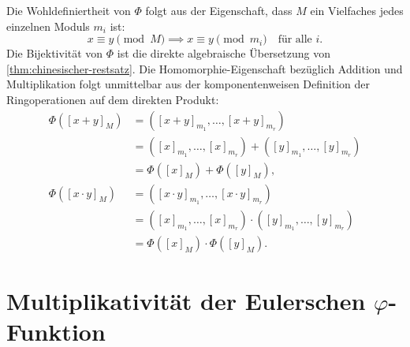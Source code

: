 \begin{math-stroke}

\begin{explanation-of-steps}
Die Wohldefiniertheit von $\Phi$ folgt aus der Eigenschaft, dass $M$ ein Vielfaches jedes einzelnen Moduls $m_i$ ist:
\[
x \equiv y \pmod M \implies x \equiv y \pmod{m_i} \quad \text{für alle } i.
\]
Die Bijektivität von $\Phi$ ist die direkte algebraische Übersetzung von \cref{thm:chinesischer-restsatz}. Die Homomorphie-Eigenschaft bezüglich Addition und Multiplikation folgt unmittelbar aus der komponentenweisen Definition der Ringoperationen auf dem direkten Produkt:
\begin{align*}
\Phi([x + y]_M) &= \left( [x + y]_{m_1}, \dots, [x + y]_{m_r} \right) \\
&= \left( [x]_{m_1}, \dots, [x]_{m_r} \right) + \left( [y]_{m_1}, \dots, [y]_{m_r} \right) \\
&= \Phi([x]_M) + \Phi([y]_M), \\[1ex]
\Phi([x \cdot y]_M) &= \left( [x \cdot y]_{m_1}, \dots, [x \cdot y]_{m_r} \right) \\
&= \left( [x]_{m_1}, \dots, [x]_{m_r} \right) \cdot \left( [y]_{m_1}, \dots, [y]_{m_r} \right) \\
&= \Phi([x]_M) \cdot \Phi([y]_M).
\end{align*}
\end{explanation-of-steps}
\end{math-stroke}

\section{Multiplikativität der Eulerschen \texorpdfstring{$\varphi$}{phi}-Funktion}


